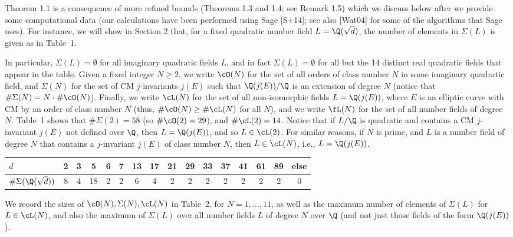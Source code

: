 Theorem 1.1 is a consequence of more refined bounds (Theorems 1.3 and 1.4; see Remark 1.5) which we discuss below after we provide some computational data (our calculations have been performed using Sage [S+14]; see also [Wat04] for some of the algorithms that Sage uses). For instance, we will show in Section 2 that, for a fixed
quadratic number field $L= \Q(\sqrt{d})$, the number of elements in $\Sigma(L)$ is given as in Table~1. 


In particular, $\Sigma(L)= \emptyset$ for all imaginary quadratic fields $L$, and in fact $\Sigma(L)= \emptyset$ for all but the 14 distinct real quadratic fields that appear in the table. Given a fixed integer $N \geq 2$, we write $\cO(N)$ for the set of all orders of class number $N$ in some imaginary quadratic field, and $\Sigma(N)$ for the set of CM $j$-invariants $j(E)$ such that $\Q(j(E))/\Q$ is an extension of degree $N$ (notice that $\#\Sigma(N)= N \cdot \#\cO(N)$). Finally, we write $\cL(N)$ for the set of all non-isomorphic fields $L= \Q(j(E))$, where $E$ is an elliptic curve with CM by an order of class number $N$ (thus, $\#\cO(N) \geq \#\cL(N)$ for all $N$), and we write $\fL(N)$ for the set of all number fields of degree $N$. Table~1 shows that $\#\Sigma(2)= 58$ (so $\#\cO(2)= 29$), and $\#\cL(2)= 14$. Notice that if $L/\Q$ is quadratic and contains a CM $j$-invariant $j(E)$ not defined over $\Q$, then $L= \Q(j(E))$, and so $L \in \cL(2)$. For similar reasons, if $N$ is prime, and $L$ is a number field of degree $N$ that contains a $j$-invariant $j(E)$ of class number $N$, then $L \in \cL(N)$, i.e., $L= \Q(j(E))$. 


	\begin{table}[!ht]
	\centering
	\begin{tabular}{l|c|c|c|c|c|c|c|c|c|c|c|c|c|c|c}
	$d$ & 2 & 3 & 5 & 6 & 7 & 13 & 17 & 21 & 29 & 33 & 37 & 41 & 61 & 89 & else \\ \hline
	$\#\Sigma(\Q(\sqrt{d}))$ & 8 & 4 & 18 & 2 & 2 & 6 & 4 & 2 & 2 & 2 & 2 & 2 & 2 & 2 & 0 
	\end{tabular}
	\end{table}


We record the sizes of $\cO(N), \Sigma(N), \cL(N)$ in Table~2, for $N= 1,\ldots, 11$, as well as the maximum number of elements of $\Sigma(L)$ for $L \in \cL(N)$, and also the maximum of $\Sigma(L)$ over all number fields $L$ of degree $N$ over $\Q$ (and not just those fields of the form $\Q(j(E))$). 


